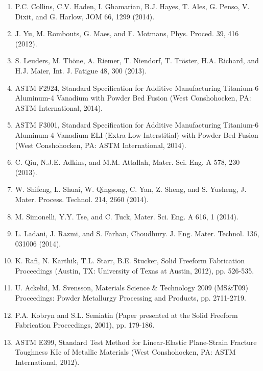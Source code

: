 \documentclass[10pt]{article}
\begin{document}
\begin{enumerate}
  \item P.C. Collins, C.V. Haden, I. Ghamarian, B.J. Hayes, T. Ales, G. Penso, V. Dixit, and G. Harlow, JOM 66, 1299 (2014).

  \item J. Yu, M. Rombouts, G. Maes, and F. Motmans, Phys. Proced. 39, 416 (2012).

  \item S. Leuders, M. Thöne, A. Riemer, T. Niendorf, T. Tröster, H.A. Richard, and H.J. Maier, Int. J. Fatigue 48, 300 (2013).

  \item ASTM F2924, Standard Specification for Additive Manufacturing Titanium-6 Aluminum-4 Vanadium with Powder Bed Fusion (West Conshohocken, PA: ASTM International, 2014).

  \item ASTM F3001, Standard Specification for Additive Manufacturing Titanium-6 Aluminum-4 Vanadium ELI (Extra Low Interstitial) with Powder Bed Fusion (West Conshohocken, PA: ASTM International, 2014).

  \item C. Qiu, N.J.E. Adkins, and M.M. Attallah, Mater. Sci. Eng. A 578, 230 (2013).

  \item W. Shifeng, L. Shuai, W. Qingsong, C. Yan, Z. Sheng, and S. Yusheng, J. Mater. Process. Technol. 214, 2660 (2014).

  \item M. Simonelli, Y.Y. Tse, and C. Tuck, Mater. Sci. Eng. A 616, 1 (2014).

  \item L. Ladani, J. Razmi, and S. Farhan, Choudhury. J. Eng. Mater. Technol. 136, 031006 (2014).

  \item K. Rafi, N. Karthik, T.L. Starr, B.E. Stucker, Solid Freeform Fabrication Proceedings (Austin, TX: University of Texas at Austin, 2012), pp. 526-535.

  \item U. Ackelid, M. Svensson, Materials Science \& Technology 2009 (MS\&T09) Proceedings: Powder Metallurgy Processing and Products, pp. 2711-2719.

  \item P.A. Kobryn and S.L. Semiatin (Paper presented at the Solid Freeform Fabrication Proceedings, 2001), pp. 179-186.

  \item ASTM E399, Standard Test Method for Linear-Elastic Plane-Strain Fracture Toughness KIc of Metallic Materials (West Conshohocken, PA: ASTM International, 2012).


\end{enumerate}
\end{document}
